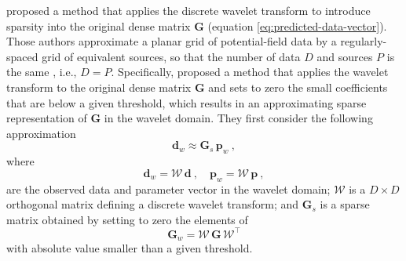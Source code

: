 \cite{li-oldenburg2010} proposed a method that applies the discrete wavelet transform to introduce sparsity into 
the original dense matrix $\mathbf{G}$ (equation \ref{eq:predicted-data-vector}).
Those authors approximate a planar grid of potential-field data by a regularly-spaced grid of equivalent sources,
so that the number of data $D$ and sources $P$ is the same , i.e., $D = P$.
Specifically, \cite{li-oldenburg2010} proposed a method that applies the wavelet transform to the original dense 
matrix $\mathbf{G}$ and sets to zero the small coefficients that are below a given threshold, which results in an 
approximating sparse representation of $\mathbf{G}$ in the wavelet domain.
They first consider the following approximation
\begin{equation}
	\mathbf{d}_{w} \approx \mathbf{G}_{s} \, \mathbf{p}_{w} \: ,
	\label{eq:approximated-linear-system-wavelet-domain}
\end{equation}
where 
\begin{equation}
	\mathbf{d}_{w} = \boldsymbol{\mathcal{W}} \, \mathbf{d} \: , \quad 
	\mathbf{p}_{w} = \boldsymbol{\mathcal{W}} \, \mathbf{p} \: ,
	\label{eq:vectors-dw-pw}
\end{equation}
are the observed data and parameter vector in the wavelet domain; $\boldsymbol{\mathcal{W}}$ is a $D \times D$ orthogonal matrix defining a 
discrete wavelet transform; and $\mathbf{G}_{s}$ is a sparse matrix obtained by setting to zero the elements of
\begin{equation}
	\mathbf{G}_{w} = \boldsymbol{\mathcal{W}} \, \mathbf{G} \, \boldsymbol{\mathcal{W}}^{\top}
	\label{eq:matrix-Gw}
\end{equation}
with absolute value smaller than a given threshold.

